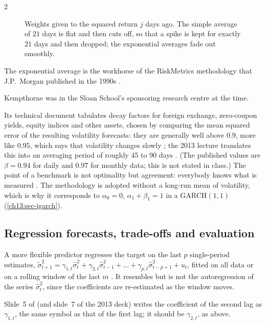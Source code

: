 \begin{paracol}{2}
\begin{figure}[ht]
\caption{Weights given to the squared return $j$ days ago. The simple average of $21$ days is flat and then cuts off,
so that a spike is kept for exactly $21$ days and then dropped; the exponential averages fade out smoothly.}\label{ch13:fig-ewma}
\end{figure}
\begin{finance}[RiskMetrics]\label{ch13:fin-riskmetrics}
The exponential average is the workhorse of the RiskMetrics methodology that J.P.~Morgan published in the 1990s
.\begin{aside}
Kempthorne was in the Sloan School's sponsoring research centre at the time.
\end{aside} Its technical document
tabulates decay factors for foreign exchange, zero-coupon yields, equity indices and other assets, chosen by comparing the
mean squared error of the resulting volatility forecasts: they are generally well above $0.9$, more like $0.95$,
which says that volatility changes slowly ; the 2013 lecture translates this into an averaging
period of roughly 45 to 90 days . (The published values are $\beta=0.94$ for daily and
$0.97$ for monthly data; this is not stated in class.) The point of a benchmark is not optimality but agreement:
everybody knows what is measured . The methodology is adopted without a long-run mean of
volatility, which is why it corresponds to $\alpha_0=0$, $\alpha_1+\beta_1=1$ in a GARCH$(1,1)$ (\cref{ch13:sec-igarch}).
\end{finance}

\subsection{Regression forecasts, trade-offs and evaluation}\label{ch13:sec-regr}
A more flexible predictor regresses the target on the last $p$ single-period estimates,
$\tilde\sigma^2_{t+1}=\gamma_{1,t}\hat\sigma_t^2+\gamma_{2,t}\hat\sigma^2_{t-1}+\dots+\gamma_{p,t}\hat\sigma^2_{t-p+1}+u_t$, fitted on all data or
on a rolling window of the last $m$ . It resembles but is not the autoregression of the series $\hat\sigma^2_t$, since the
coefficients are re-estimated as the window moves.

\begin{coursenote}
Slide~5 of  (and slide~7 of the 2013 deck) writes the coefficient of the second lag as $\gamma_{1,t}$, the same symbol as
that of the first lag; it should be $\gamma_{2,t}$, as above.
\end{coursenote}


\end{paracol}
